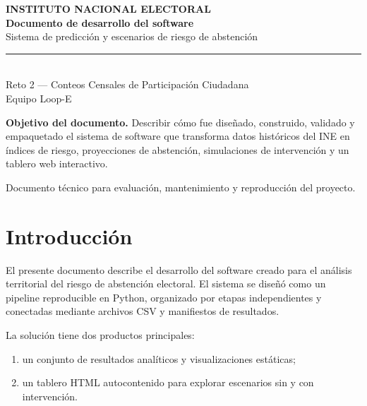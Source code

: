 \documentclass[11pt,a4paper]{article}
\begin{document}
\begin{titlepage}
\thispagestyle{empty}
\vspace*{1cm}
\begin{center}
{\Large\color{ineblue}\textbf{INSTITUTO NACIONAL ELECTORAL}}\\[0.8cm]
{\Huge\color{ineblue}\textbf{Documento de desarrollo del software}}\\[0.3cm]
{\LARGE Sistema de predicción y escenarios de riesgo de abstención}\\[1cm]
\rule{0.85\textwidth}{0.8pt}\\[0.6cm]
{\large Reto 2 — Conteos Censales de Participación Ciudadana}\\[0.3cm]
{\large Equipo Loop-E}\\[1.2cm]
\end{center}

\begin{decision}
\textbf{Objetivo del documento.} Describir cómo fue diseñado, construido, validado y empaquetado el sistema de software que transforma datos históricos del INE en índices de riesgo, proyecciones de abstención, simulaciones de intervención y un tablero web interactivo.
\end{decision}

\vfill
\begin{center}
\small Documento técnico para evaluación, mantenimiento y reproducción del proyecto.
\end{center}
\end{titlepage}

\tableofcontents
\newpage

\section{Introducción}

El presente documento describe el desarrollo del software creado para el análisis territorial del riesgo de abstención electoral. El sistema se diseñó como un pipeline reproducible en Python, organizado por etapas independientes y conectadas mediante archivos CSV y manifiestos de resultados.

La solución tiene dos productos principales:

\begin{enumerate}
    \item un conjunto de resultados analíticos y visualizaciones estáticas;
    \item un tablero HTML autocontenido para explorar escenarios sin y con intervención.
\end{enumerate}
\end{document}
